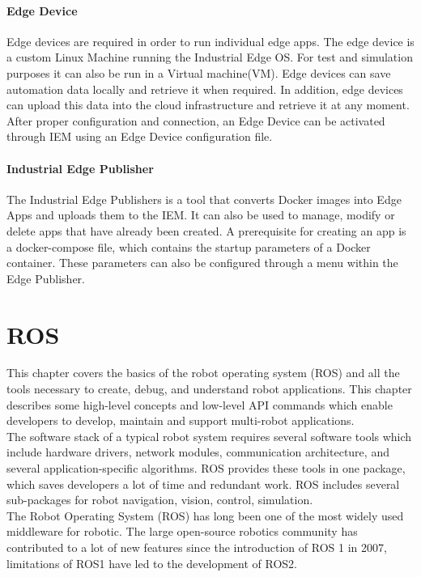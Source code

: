 		\paragraph{Edge Device}
		Edge devices are required in order to run individual edge apps. The edge device is a custom Linux Machine running the Industrial Edge OS. For test and simulation purposes it can also be run in a Virtual machine(VM). Edge devices can save automation data locally and retrieve it when required. In addition, edge devices can upload this data into the cloud infrastructure and retrieve it at any moment. After proper configuration and connection,  an Edge Device can be activated through IEM using an Edge Device configuration file.
			
		\paragraph{Industrial Edge Publisher}
		The Industrial Edge Publishers is a tool that converts Docker images into Edge Apps and uploads them to the IEM. It can also be used to manage, modify or delete apps that have already been created.\cite{siemensIE_App} A prerequisite for creating an app is a docker-compose file, which contains the startup parameters of a Docker container. These parameters can also be configured through a menu within the Edge Publisher.
			

	
	\section{ROS}
	\label{Grundlagen:ROS2}		
	This chapter covers the basics of the robot operating system (ROS) and all the tools necessary to create, debug, and understand robot applications. This chapter describes some high-level concepts and low-level API commands which enable developers to develop, maintain and support multi-robot applications. \\
	
	The software stack of a typical robot system requires several software tools which include hardware drivers, network modules, communication architecture, and several application-specific algorithms. ROS provides these tools in one package, which saves developers a lot of time and redundant work. ROS includes several sub-packages for robot navigation, vision, control, simulation.\\
	
	The Robot Operating System (ROS) has long been one of the most widely used middleware for robotic. The large open-source robotics community has contributed to a lot of new features since the introduction of ROS 1 in 2007, limitations of ROS1 have led to the development of ROS2.\cite{ros2Basic}\\


